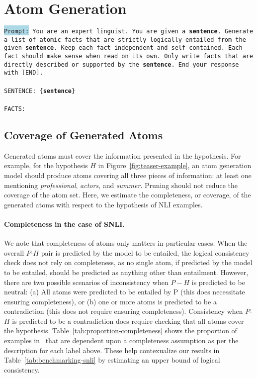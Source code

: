 


\section{Atom Generation}
\label{appendix:atom-generation}
\vspace{-3em}
\begin{prompt}[title={Prompt \thetcbcounter: Atom Generation}, label=prompt:atom-generation]
\texttt{\colorbox{lightblue}{Prompt:} You are an expert linguist. You are given a \textbf{sentence}. Generate a list of atomic facts that are strictly logically entailed from the given \textbf{sentence}. Keep each fact independent and self-contained. Each fact should make sense when read on its own. Only write facts that are directly described or supported by the \textbf{sentence}. End your response with [END].\\\\SENTENCE: \{\textbf{sentence}\}\\\\FACTS:}
\end{prompt}

\subsection{Coverage of Generated Atoms}
\label{appendix:coverage-atoms}
Generated atoms must cover the information presented in the hypothesis. 
%
For example, for the hypothesis $H$ in Figure~\ref{fig:teaser-example}, an atom generation model should produce atoms covering all three pieces of information: at least one mentioning \textit{professional}, \textit{actors}, and \textit{summer}.
%
Pruning should not reduce the coverage of the atom set.
%
Here, we estimate the completeness, or coverage, of the generated atoms with respect to the hypothesis of NLI examples. 
%

\paragraph{Completeness in the case of SNLI.} We note that completeness of atoms only matters in particular cases. 
%
When the overall $P$-$H$ pair is predicted by the model to be entailed, the logical consistency check does not rely on completeness, as no single atom, if predicted by the model to be entailed, should be predicted as anything other than entailment.
%
However, there are two possible scenarios of inconsistency when $P-H$ is predicted to be neutral: (a) All atoms were predicted to be entailed by P (this does necessitate ensuring completeness), or (b) one or more atoms is predicted to be a contradiction (this does not require ensuring completeness).
%
Consistency when $P$-$H$ is predicted to be a contradiction does require checking that all atoms cover the hypothesis.
%
Table~\ref{tab:proportion-completeness} shows the proportion of examples in \snlitest~that are dependent upon a completeness assumption as per the description for each label above.
These help contexualize our results in Table~\ref{tab:benchmarking-snli} by estimating an upper bound of logical consistency.
%
%

